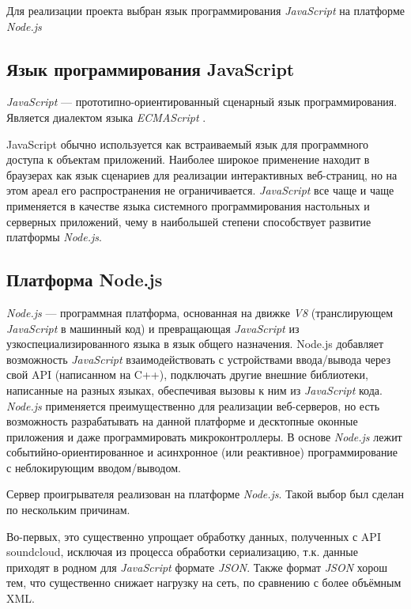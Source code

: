 Для реализации проекта выбран язык программирования \textit{JavaScript} на
платформе \textit{Node.js}

\subsection{Язык программирования JavaScript}

\textit{JavaScript} \cite{wiki:js} --- прототипно-ориентированный сценарный язык
программирования. Является диалектом языка \textit{ECMAScript} \cite{wiki:ecma}.

JavaScript обычно используется как встраиваемый язык для программного
доступа к объектам приложений. Наиболее широкое применение находит в
браузерах как язык сценариев для реализации интерактивных веб-страниц,
но на этом ареал его распространения не ограничивается. \textit{JavaScript} все
чаще и чаще применяется в качестве языка системного программирования
настольных и серверных приложений, чему в наибольшей степени
способствует развитие платформы\textit{ Node.js}.

\subsection{Платформа Node.js}

\textit{Node.js} \cite{wiki:nodejs} --- программная платформа, основанная на
движке \textit{V8} \cite{wiki:v8}
(транслирующем \textit{JavaScript} в машинный код) и превращающая \textit{ JavaScript} из
узкоспециализированного языка в язык общего назначения. Node.js
добавляет возможность \textit{JavaScript} взаимодействовать с устройствами
ввода/вывода через свой API (написанном на C++), подключать другие
внешние библиотеки, написанные на разных языках, обеспечивая вызовы к
ним из \textit{JavaScript} кода.
\textit{Node.js} применяется преимущественно для
реализации веб-серверов, но есть возможность разрабатывать на данной платформе и
десктопные оконные приложения и даже программировать
микроконтроллеры. В основе \textit{Node.js} лежит
событийно-ориентированное и асинхронное (или реактивное)
программирование с неблокирующим вводом/выводом.

Сервер проигрывателя реализован на платформе \textit{Node.js}. Такой выбор был
сделан по нескольким причинам.

Во-первых, это существенно упрощает обработку данных, полученных с API
soundcloud, исключая из процесса обработки сериализацию,
т.к. данные приходят в родном для \textit{JavaScript} формате \textit{JSON}. Также формат \textit{JSON}
хорош тем, что существенно снижает нагрузку на сеть, по сравнению с
более объёмным XML.

